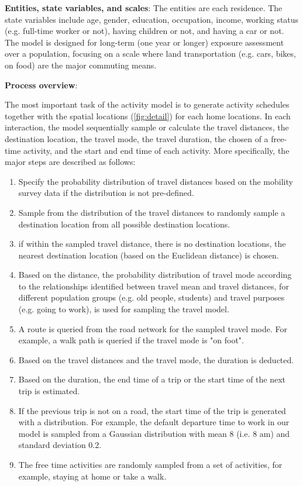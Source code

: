 \documentclass[]{article}
\begin{document}
\textbf{Entities, state variables, and scales}:
The entities are each residence. The state variables include age, gender, education, occupation, income, working status (e.g. full-time worker or not), having children or not, and having a car or not.  The model is designed for long-term (one year or longer) exposure assessment over a population, focusing on a scale where land transportation (e.g. cars, bikes, on food) are the major commuting means. 

\textbf{Process overview}:

The most important task of the activity model is to generate activity schedules together with the spatial locations (\cref{fig:detail}) for each home locations.  In each interaction, the model sequentially sample or calculate the travel distances, the destination location, the travel mode, the  travel duration, the chosen of a free-time activity, and the start and end time of each activity. More specifically, the major steps are described as follows:   

\begin{enumerate}
    \item Specify the probability distribution of travel distances based on the mobility survey data if the distribution is not pre-defined. 
    \item Sample from the distribution of the travel distances to randomly sample a destination location from all possible destination locations.
    \item if within the sampled travel distance, there is no destination locations, the nearest destination location (based on the Euclidean distance) is chosen.  
    \item Based on the distance, the probability distribution of travel mode according to the relationships identified between travel mean and travel distances, for different population groups  (e.g. old people, students) and travel purposes (e.g. going to work), is used for sampling the travel model. 
    \item A route is queried from the road network for the sampled travel mode. For example, a walk path is queried if the travel mode is "on foot".  
    \item Based on the travel distances and the travel mode, the duration is deducted. 
    \item Based on the duration, the end time of a trip or the start time of the next trip is estimated. 
    \item If the previous trip is not on a road, the start time of the trip is generated with a distribution. For example, the default departure time to work in our model is sampled from a Gaussian distribution with mean 8 (i.e. 8 am) and standard deviation 0.2. 
    \item The free time activities are randomly sampled from a set of activities, for example, staying at home or take a walk. 
\end{enumerate}
\end{document}
